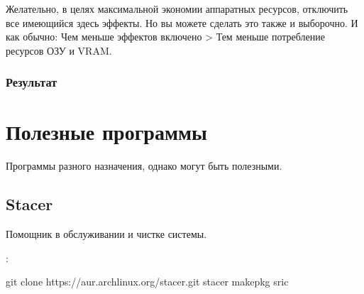 \documentclass[letterpaper,10pt,russian,openany]{sphinxmanual}
\begin{document}
\sphinxAtStartPar
Желательно, в целях максимальной экономии аппаратных ресурсов, отключить все имеющийся здесь эффекты.
Но вы можете сделать это также и выборочно. И как обычно: Чем меньше эффектов включено \sphinxhyphen{}> Тем меньше потребление ресурсов ОЗУ и VRAM.

\ignorespaces 

\subsection{Результат}
\label{\detokenize{source/de-optimizations:cinnamon-result}}\label{\detokenize{source/de-optimizations:index-26}}\label{\detokenize{source/de-optimizations:id12}}
\noindent{}

\sphinxstepscope


\chapter{Полезные программы}
\label{\detokenize{source/useful-programs:useful-programs}}\label{\detokenize{source/useful-programs:id1}}\label{\detokenize{source/useful-programs::doc}}
\sphinxAtStartPar
Программы разного назначения, однако могут быть полезными.

\ignorespaces 

\section{Stacer}
\label{\detokenize{source/useful-programs:stacer}}\label{\detokenize{source/useful-programs:index-0}}\label{\detokenize{source/useful-programs:id2}}
\sphinxAtStartPar
Помощник в обслуживании и чистке системы.

\noindent{}

\sphinxAtStartPar
{}:

\begin{sphinxVerbatim}[commandchars=\\\{\}]
git clone https://aur.archlinux.org/stacer.git 
 stacer                                      
makepkg \PYGZhy{}sric                                  
\end{sphinxVerbatim}
\end{document}
